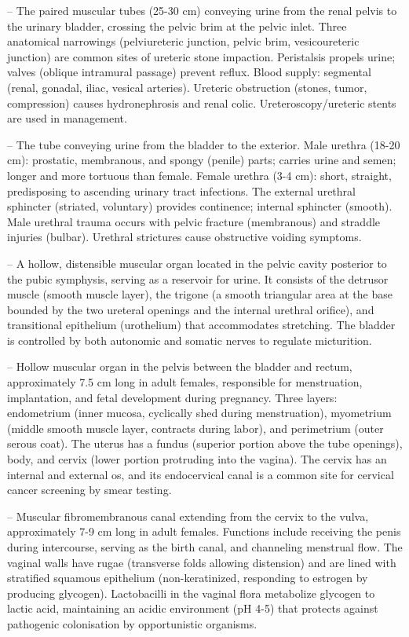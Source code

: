 -- The paired muscular tubes (25-30 cm) conveying urine from the renal pelvis to the urinary bladder, crossing the pelvic brim at the pelvic inlet. Three anatomical narrowings (pelviureteric junction, pelvic brim, vesicoureteric junction) are common sites of ureteric stone impaction. Peristalsis propels urine; valves (oblique intramural passage) prevent reflux. Blood supply: segmental (renal, gonadal, iliac, vesical arteries). Ureteric obstruction (stones, tumor, compression) causes hydronephrosis and renal colic. Ureteroscopy/ureteric stents are used in management.

-- The tube conveying urine from the bladder to the exterior. Male urethra (18-20 cm): prostatic, membranous, and spongy (penile) parts; carries urine and semen; longer and more tortuous than female. Female urethra (3-4 cm): short, straight, predisposing to ascending urinary tract infections. The external urethral sphincter (striated, voluntary) provides continence; internal sphincter (smooth). Male urethral trauma occurs with pelvic fracture (membranous) and straddle injuries (bulbar). Urethral strictures cause obstructive voiding symptoms.

-- A hollow, distensible muscular organ located in the pelvic cavity posterior to the pubic symphysis, serving as a reservoir for urine. It consists of the detrusor muscle (smooth muscle layer), the trigone (a smooth triangular area at the base bounded by the two ureteral openings and the internal urethral orifice), and transitional epithelium (urothelium) that accommodates stretching. The bladder is controlled by both autonomic and somatic nerves to regulate micturition.

-- Hollow muscular organ in the pelvis between the bladder and rectum, approximately 7.5 cm long in adult females, responsible for menstruation, implantation, and fetal development during pregnancy. Three layers: endometrium (inner mucosa, cyclically shed during menstruation), myometrium (middle smooth muscle layer, contracts during labor), and perimetrium (outer serous coat). The uterus has a fundus (superior portion above the tube openings), body, and cervix (lower portion protruding into the vagina). The cervix has an internal and external os, and its endocervical canal is a common site for cervical cancer screening by smear testing.

-- Muscular fibromembranous canal extending from the cervix to the vulva, approximately 7-9 cm long in adult females. Functions include receiving the penis during intercourse, serving as the birth canal, and channeling menstrual flow. The vaginal walls have rugae (transverse folds allowing distension) and are lined with stratified squamous epithelium (non-keratinized, responding to estrogen by producing glycogen). Lactobacilli in the vaginal flora metabolize glycogen to lactic acid, maintaining an acidic environment (pH 4-5) that protects against pathogenic colonisation by opportunistic organisms.

